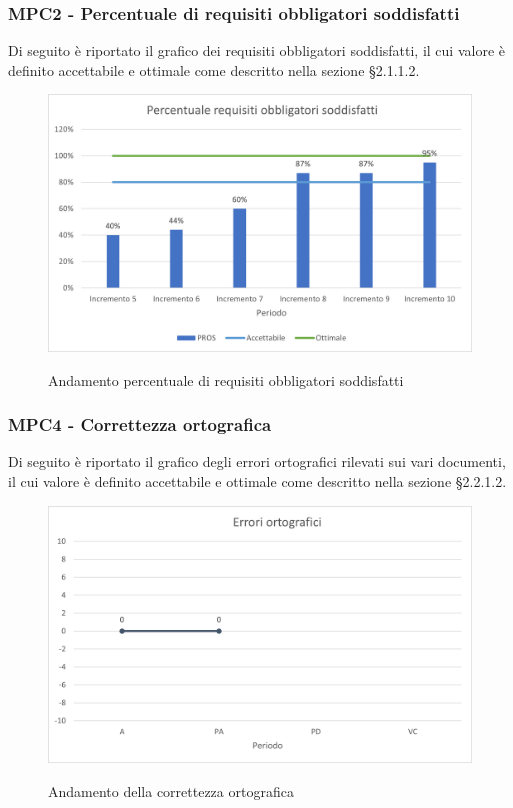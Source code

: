 \subsubsection{MPC2 - Percentuale di requisiti obbligatori soddisfatti}
Di seguito è riportato il grafico dei requisiti obbligatori soddisfatti, il cui valore è definito accettabile e ottimale come descritto nella sezione §2.1.1.2.\\

\begin{figure}[H]
\centering
\includegraphics[scale=0.78]{res/ResocontoAttivitaDiVerifica/res/metriche/grafici/img/PROS.png}\\
\caption{Andamento percentuale di requisiti obbligatori soddisfatti}
\end{figure}



\subsubsection{MPC4 - Correttezza ortografica}
Di seguito è riportato il grafico degli errori ortografici rilevati sui vari documenti, il cui valore è definito accettabile e ottimale come descritto nella sezione §2.2.1.2.\\

\begin{figure}[H]
\centering
\includegraphics[scale=0.78]{res/ResocontoAttivitaDiVerifica/res/metriche/grafici/img/correttezzaOrtografica.png}\\
\caption{Andamento della correttezza ortografica}
\end{figure}

